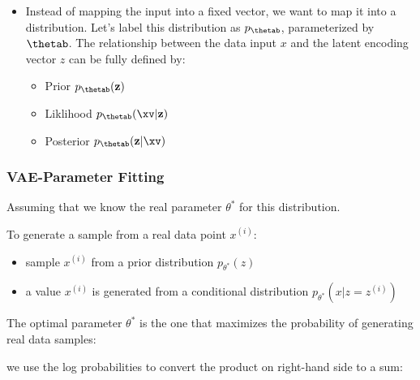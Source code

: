 \begin{frame}

\begin{itemize}
\item Instead of mapping the input into a fixed vector, we want to map it into a distribution. Let's label this distribution as $p_{\thetab}$, parameterized by ${\thetab}$. The relationship between the data input $x$ and the latent encoding vector $z$ can be fully defined by:

  \begin{itemize}
    \item Prior $p_{\thetab}(\mathbf{z})$
    \item Liklihood $p_{\thetab}( \xv|\mathbf{z})$
    \item Posterior $p_{\thetab}(\mathbf{z} | \xv)$
  \end{itemize}
\end{itemize}

\end{frame}


\begin{frame}
\frametitle{VAE-Parameter Fitting}
\vspace{2mm}

Assuming that we know the real parameter ${\theta}^*$ for this distribution. 

To generate a sample from a real data point $x^{(i)}$:

\begin{itemize}
\item sample $x^{(i)}$ from a prior distribution $p_{{\theta}^*} (z)$
\item a value $x^{(i)}$ is generated from a conditional distribution $p_{{\theta}^*} (x|z=z^{(i)})$ 
\end{itemize}

\vspace{1mm}
The optimal parameter ${\theta}^*$ is the one that maximizes the probability of generating real data samples:

\vspace{2mm}
\vspace{2mm}

we use the log probabilities to convert the product on right-hand side to a sum:

\vspace{2mm}

\end{frame}  

